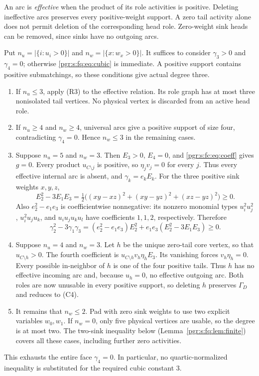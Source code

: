 \documentclass[11pt]{article}
\numberwithin{equation}{section}
\theoremstyle{definition}\newtheorem{definition}[theorem]{Definition}\newtheorem{remark}[theorem]{Remark}
\begin{document}
An arc is \emph{effective} when the product of its role activities is positive. Deleting ineffective arcs preserves every positive-weight support. A zero tail activity alone does not permit deletion of the corresponding head role. Zero-weight sink heads can be removed, since sinks have no outgoing arcs.

Put $n_u=|\{i:u_i>0\}|$ and $n_w=|\{x:w_x>0\}|$. It suffices to consider $\gamma_3>0$ and $\gamma_4=0$; otherwise \eqref{pgr:s:fq:eq:cubic} is immediate. A positive support contains positive submatchings, so these conditions give actual degree three.
\begin{enumerate}
\item If $n_u\le3$, apply (R3) to the effective relation. Its role graph has at most three nonisolated tail vertices. No physical vertex is discarded from an active head role.
\item If $n_u\ge4$ and $n_w\ge4$, universal arcs give a positive support of size four, contradicting $\gamma_4=0$. Hence $n_w\le3$ in the remaining cases.
\item Suppose $n_u=5$ and $n_w=3$. Then $E_3>0$, $E_4=0$, and \eqref{pgr:s:fc:eq:coeff} gives $g=0$. Every product $u_{C\setminus j}$ is positive, so $\eta_jv_j=0$ for every $j$. Thus every effective internal arc is absent, and $\gamma_k=e_kE_k$.
For the three positive sink weights $x,y,z$,
\[
 E_2^2-3E_1E_3=\tfrac12\bigl((xy-xz)^2+(xy-yz)^2+(xz-yz)^2\bigr)\ge0.
\]
Also $e_2^2-e_1e_3$ is coefficientwise nonnegative: its nonzero monomial types $u_i^2u_j^2$, $u_i^2u_ju_k$, and $u_iu_ju_ku_l$ have coefficients $1,1,2$, respectively. Therefore
\[
 \gamma_2^2-3\gamma_1\gamma_3
 =(e_2^2-e_1e_3)E_2^2+e_1e_3(E_2^2-3E_1E_3)\ge0.
\]
\item Suppose $n_u=4$ and $n_w=3$. Let $h$ be the unique zero-tail core vertex, so that $u_{C\setminus h}>0$. The fourth coefficient is $u_{C\setminus h}v_h\eta_hE_3$. Its vanishing forces $v_h\eta_h=0$. Every possible in-neighbor of $h$ is one of the four positive tails. Thus $h$ has no effective incoming arc and, because $u_h=0$, no effective outgoing arc. Both roles are now unusable in every positive support, so deleting $h$ preserves $\Gamma_D$ and reduces to (C4).
\item It remains that $n_w\le2$. Pad with zero sink weights to use two explicit variables $w_0,w_1$. If $n_w=0$, only five physical vertices are usable, so the degree is at most two. The two-sink inequality below (Lemma~\ref{pgr:s:fq:lem:finite}) covers all these cases, including further zero activities.
\end{enumerate}
This exhausts the entire face $\gamma_4=0$. In particular, no quartic-normalized inequality is substituted for the required cubic constant $3$.
\end{document}
